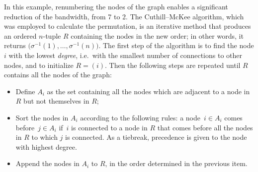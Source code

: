 In this example,
renumbering the nodes of the graph enables a significant reduction of the bandwidth,
from 7 to 2.
The Cuthill--McKee algorithm,
which was employed to calculate the permutation,
is an iterative method that produces an ordered $n$-tuple $R$ containing the nodes in the new order;
in other words, it returns $\bigl(\sigma^{-1}(1), \dots, \sigma^{-1}(n)\bigr)$.
The first step of the algorithm is to find the node $i$ with the lowest \emph{degree},
i.e.\ with the smallest number of connections to other nodes,
and to initialize $R = (i)$.
Then the following steps are repeated until $R$ contains all the nodes of the graph:
\begin{itemize}
    \item
        Define $A_i$ as the set containing all the nodes which are adjacent to a node in $R$ but not themselves in $R$;

    \item
        Sort the nodes in $A_i$ according to the following rules:
        a node~$i \in A_i$ comes before~$j \in A_i$ if~$i$ is connected to a node in $R$ that comes before all the nodes in $R$ to which $j$ is connected.
        As a tiebreak,
        precedence is given to the node with highest degree.

    \item
        Append the nodes in $A_i$ to $R$,
        in the order determined in the previous item.
\end{itemize}

